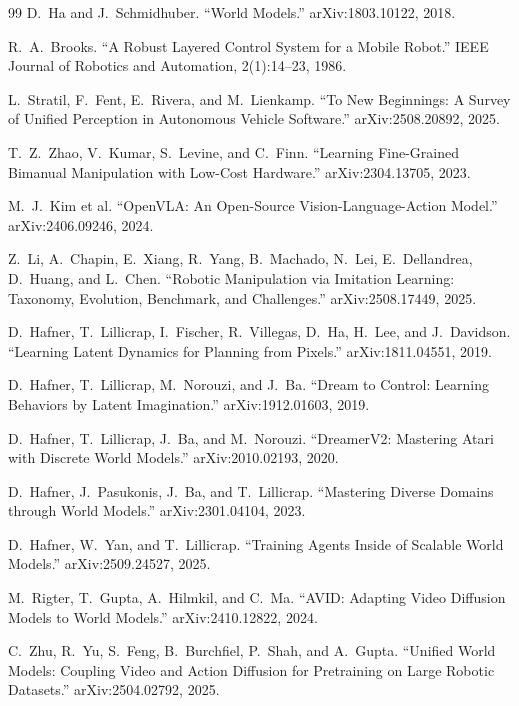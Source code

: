 \documentclass[12pt]{report}
\begin{document}
\begin{thebibliography}{99}
D.~Ha and J.~Schmidhuber.
``World Models.''
arXiv:1803.10122, 2018.

R.~A.~Brooks.
``A Robust Layered Control System for a Mobile Robot.''
IEEE Journal of Robotics and Automation, 2(1):14--23, 1986.

L.~Stratil, F.~Fent, E.~Rivera, and M.~Lienkamp.
``To New Beginnings: A Survey of Unified Perception in Autonomous Vehicle Software.''
arXiv:2508.20892, 2025.

T.~Z.~Zhao, V.~Kumar, S.~Levine, and C.~Finn.
``Learning Fine-Grained Bimanual Manipulation with Low-Cost Hardware.''
arXiv:2304.13705, 2023.

M.~J.~Kim et al.
``OpenVLA: An Open-Source Vision-Language-Action Model.''
arXiv:2406.09246, 2024.

Z.~Li, A.~Chapin, E.~Xiang, R.~Yang, B.~Machado, N.~Lei, E.~Dellandrea, D.~Huang, and L.~Chen.
``Robotic Manipulation via Imitation Learning: Taxonomy, Evolution, Benchmark, and Challenges.''
arXiv:2508.17449, 2025.

D.~Hafner, T.~Lillicrap, I.~Fischer, R.~Villegas, D.~Ha, H.~Lee, and J.~Davidson.
``Learning Latent Dynamics for Planning from Pixels.''
arXiv:1811.04551, 2019.

D.~Hafner, T.~Lillicrap, M.~Norouzi, and J.~Ba.
``Dream to Control: Learning Behaviors by Latent Imagination.''
arXiv:1912.01603, 2019.

D.~Hafner, T.~Lillicrap, J.~Ba, and M.~Norouzi.
``DreamerV2: Mastering Atari with Discrete World Models.''
arXiv:2010.02193, 2020.

D.~Hafner, J.~Pasukonis, J.~Ba, and T.~Lillicrap.
``Mastering Diverse Domains through World Models.''
arXiv:2301.04104, 2023.

D.~Hafner, W.~Yan, and T.~Lillicrap.
``Training Agents Inside of Scalable World Models.''
arXiv:2509.24527, 2025.

M.~Rigter, T.~Gupta, A.~Hilmkil, and C.~Ma.
``AVID: Adapting Video Diffusion Models to World Models.''
arXiv:2410.12822, 2024.

C.~Zhu, R.~Yu, S.~Feng, B.~Burchfiel, P.~Shah, and A.~Gupta.
``Unified World Models: Coupling Video and Action Diffusion for Pretraining on Large Robotic Datasets.''
arXiv:2504.02792, 2025.


\end{thebibliography}
\end{document}
